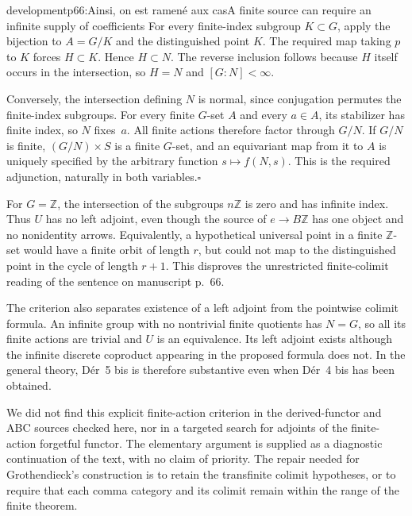\begin{dcomment}{development}{p66:Ainsi, on est ramené aux cas}{A finite source can require an infinite supply of coefficients}
For every finite-index subgroup $K\subset G$, apply the bijection to $A=G/K$ and the distinguished point $K$. The required map taking $p$ to $K$ forces $H\subset K$. Hence $H\subset N$. The reverse inclusion follows because $H$ itself occurs in the intersection, so $H=N$ and $[G:N]<\infty$.

Conversely, the intersection defining $N$ is normal, since conjugation permutes the finite-index subgroups. For every finite $G$-set $A$ and every $a\in A$, its stabilizer has finite index, so $N$ fixes~$a$. All finite actions therefore factor through $G/N$. If $G/N$ is finite, $(G/N)\times S$ is a finite $G$-set, and an equivariant map from it to $A$ is uniquely specified by the arbitrary function $s\mapsto f(N,s)$. This is the required adjunction, naturally in both variables.\hfill$\square$

For $G=\mathbb Z$, the intersection of the subgroups $n\mathbb Z$ is zero and has infinite index. Thus $U$ has no left adjoint, even though the source of $e\to B\mathbb Z$ has one object and no nonidentity arrows. Equivalently, a hypothetical universal point in a finite $\mathbb Z$-set would have a finite orbit of length $r$, but could not map to the distinguished point in the cycle of length $r+1$. This disproves the unrestricted finite-colimit reading of the sentence on manuscript p.~66.

The criterion also separates existence of a left adjoint from the pointwise colimit formula. An infinite group with no nontrivial finite quotients has $N=G$, so all its finite actions are trivial and $U$ is an equivalence. Its left adjoint exists although the infinite discrete coproduct appearing in the proposed formula does not. In the general theory, Dér~5 bis is therefore substantive even when Dér~4 bis has been obtained.

We did not find this explicit finite-action criterion in the derived-functor and ABC sources checked here, nor in a targeted search for adjoints of the finite-action forgetful functor. The elementary argument is supplied as a diagnostic continuation of the text, with no claim of priority. The repair needed for Grothendieck's construction is to retain the transfinite colimit hypotheses, or to require that each comma category and its colimit remain within the range of the finite theorem.
\end{dcomment}

